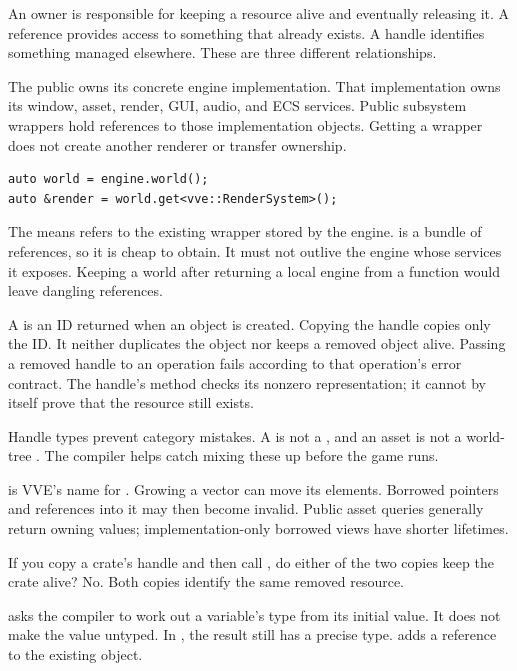 \documentclass[11pt,a4paper]{article}
\begin{document}
An owner is responsible for keeping a resource alive and eventually releasing it. A reference provides access to something that already exists. A handle identifies something managed elsewhere. These are three different relationships.

The public  owns its concrete engine implementation. That implementation owns its window, asset, render, GUI, audio, and ECS services. Public subsystem wrappers hold references to those implementation objects. Getting a wrapper does not create another renderer or transfer ownership.
\begin{lstlisting}
auto world = engine.world();
auto &render = world.get<vve::RenderSystem>();
\end{lstlisting}
The \api{&} means  refers to the existing wrapper stored by the engine.  is a bundle of references, so it is cheap to obtain. It must not outlive the engine whose services it exposes. Keeping a world after returning a local engine from a function would leave dangling references.

A  is an ID returned when an object is created. Copying the handle copies only the ID. It neither duplicates the object nor keeps a removed object alive. Passing a removed handle to an operation fails according to that operation's error contract. The handle's  method checks its nonzero representation; it cannot by itself prove that the resource still exists.

Handle types prevent category mistakes. A  is not a , and an asset  is not a world-tree . The compiler helps catch mixing these up before the game runs.

 is VVE's name for . Growing a vector can move its elements. Borrowed pointers and references into it may then become invalid. Public asset queries generally return owning values; implementation-only borrowed views have shorter lifetimes.

\begin{tryit}If you copy a crate's handle and then call , do either of the two copies keep the crate alive? No. Both copies identify the same removed resource.\end{tryit}

 asks the compiler to work out a variable's type from its initial value. It does not make the value untyped. In , the result still has a precise  type.  adds a reference to the existing object.
\end{document}
